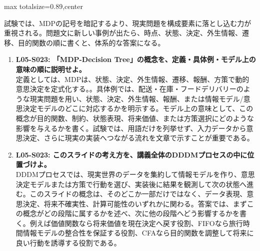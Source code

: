 \begin{minipage}[t]{0.58\textwidth}
\begin{adjustbox}{max totalsize={\textwidth}{0.89\textheight},center}
\begin{minipage}{\textwidth}
試験では、MDPの記号を暗記するより、現実問題を構成要素に落とし込む力が重視される。問題文に新しい事例が出たら、時点、状態、決定、外生情報、遷移、目的関数の順に書くと、体系的な答案になる。\par{}\begin{enumerate}\item \textbf{L05-S023: 「MDP-Decision Tree」の概念を、定義・具体例・モデル上の意味の順に説明せよ。}\\定義としては、MDPは、状態、決定、外生情報、遷移、報酬、方策で動的意思決定を定式化する。。具体例では、配送・在庫・フードデリバリーのような現実問題を用い、状態、決定、外生情報、報酬、または情報モデル/意思決定モデルのどこに対応するかを明示する。モデル上の意味として、この概念が目的関数、制約、状態表現、将来価値、または方策選択にどのような影響を与えるかを書く。試験では、用語だけを列挙せず、入力データから意思決定、さらに現実の実装へつながる流れを文章で示すことが重要である。\item \textbf{L05-S023: このスライドの考え方を、講義全体のDDDMプロセスの中に位置づけよ。}\\DDDMプロセスでは、現実世界のデータを集約して情報モデルを作り、意思決定モデルまたは方策で行動を選び、実装後に結果を観測して次の状態へ進む。このスライドの概念は、そのどこか一部だけではなく、データ表現、意思決定、将来不確実性、計算可能性のいずれかに関わる。答案では、まずこの概念がどの段階に属するかを述べ、次に他の段階へどう影響するかを書く。例えば価値関数なら将来価値を現在決定へ戻す役割、FIFOなら旅行時間情報モデルの整合性を保証する役割、CFAなら目的関数を調整して将来に良い行動を誘導する役割である。\end{enumerate}
\end{minipage}
\end{adjustbox}
\end{minipage}


